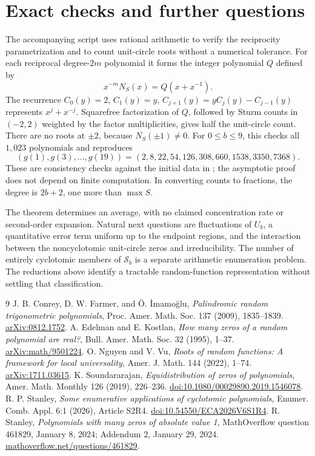 \documentclass[11pt]{article}
\begin{document}
\section{Exact checks and further questions}
The accompanying script uses rational arithmetic to verify the reciprocity
parametrization and to count unit-circle roots without a numerical tolerance.
For each reciprocal degree-$2m$ polynomial it forms the integer polynomial
$Q$ defined by
\[
 x^{-m}N_S(x)=Q(x+x^{-1}).
\]
The recurrence $C_0(y)=2$, $C_1(y)=y$,
$C_{j+1}(y)=yC_j(y)-C_{j-1}(y)$ represents $x^j+x^{-j}$.
Squarefree factorization of $Q$, followed by Sturm counts in $(-2,2)$
weighted by the factor multiplicities, gives half the unit-circle count.
There are no roots at $\pm2$, because $N_S(\pm1)\ne0$.
For $0\le b\le9$, this checks all $1{,}023$ polynomials and reproduces
\[
 (g(1),g(3),\ldots,g(19))
 =(2,8,22,54,126,308,660,1538,3350,7368).
\]
These are consistency checks against the initial data in \cite{StanleyMO};
the asymptotic proof does not depend on finite computation.
In converting counts to fractions, the degree is $2b+2$, one more than
$\max S$.

The theorem determines an average, with no claimed concentration rate or
second-order expansion. Natural next questions are fluctuations of $U_b$,
a quantitative error term uniform up to the endpoint regions, and the
interaction between the noncyclotomic unit-circle zeros and irreducibility.
The number of entirely cyclotomic members of $\mathcal S_b$ is a separate
arithmetic enumeration problem. The reductions above identify a tractable
random-function representation without settling that classification.

\begin{thebibliography}{9}
J. B. Conrey, D. W. Farmer, and \"O. \.{I}mamo\u glu,
\emph{Palindromic random trigonometric polynomials},
Proc. Amer. Math. Soc. 137 (2009), 1835--1839.
\href{https://arxiv.org/abs/0812.1752}{arXiv:0812.1752}.
A. Edelman and E. Kostlan,
\emph{How many zeros of a random polynomial are real?},
Bull. Amer. Math. Soc. 32 (1995), 1--37.
\href{https://arxiv.org/abs/math/9501224}{arXiv:math/9501224}.
O. Nguyen and V. Vu,
\emph{Roots of random functions: A framework for local universality},
Amer. J. Math. 144 (2022), 1--74.
\href{https://arxiv.org/abs/1711.03615}{arXiv:1711.03615}.
K. Soundararajan,
\emph{Equidistribution of zeros of polynomials},
Amer. Math. Monthly 126 (2019), 226--236.
\href{https://doi.org/10.1080/00029890.2019.1546078}{doi:10.1080/00029890.2019.1546078}.
R. P. Stanley,
\emph{Some enumerative applications of cyclotomic polynomials},
Enumer. Comb. Appl. 6:1 (2026), Article S2R4.
\href{https://doi.org/10.54550/ECA2026V6S1R4}{doi:10.54550/ECA2026V6S1R4}.
R. Stanley,
\emph{Polynomials with many zeros of absolute value 1},
MathOverflow question 461829, January 8, 2024; Addendum 2, January 29, 2024.
\href{https://mathoverflow.net/questions/461829/}{mathoverflow.net/questions/461829}.
\end{thebibliography}
\end{document}
